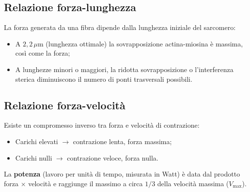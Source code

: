 \documentclass[12pt,a4paper]{report}
\begin{document}
\subsection{Relazione forza-lunghezza}
La forza generata da una fibra dipende dalla lunghezza iniziale del sarcomero:
\begin{itemize}
\item A \(2{,}2\,\mu\mathrm{m}\) (lunghezza ottimale) la sovrapposizione actina-miosina è massima, così come la forza;
\item A lunghezze minori o maggiori, la ridotta sovrapposizione o l'interferenza sterica diminuiscono il numero di ponti trasversali possibili.
\end{itemize}
\subsection{Relazione forza-velocità}
Esiste un compromesso inverso tra forza e velocità di contrazione:
\begin{itemize}
\item Carichi elevati \(\rightarrow\) contrazione lenta, forza massima;
\item Carichi nulli \(\rightarrow\) contrazione veloce, forza nulla.
\end{itemize}
La \textbf{potenza} (lavoro per unità di tempo, misurata in Watt) è data dal prodotto forza \(\times\) velocità e raggiunge il massimo a circa \(1/3\) della velocità massima (\(V_{\max}\)).
\end{document}
